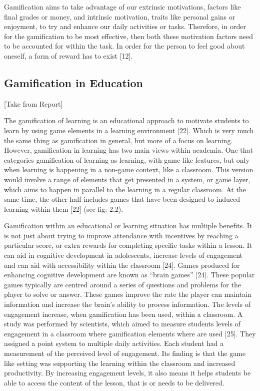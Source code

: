 \documentclass{sigchi}
\begin{document}
Gamification aims to take advantage of our extrinsic motivations, factors like final grades or money, and intrinsic motivation, traits like personal gains or enjoyment, to try and enhance our daily activities or tasks. Therefore, in order for the gamification to be most effective, then both these motivation factors need to be accounted for within the task. In order for the person to feel good about oneself, a form of reward has to exist [12]. 

\subsection{Gamification in Education}
[Take from Report]

The gamification of learning is an educational approach to motivate students to learn by using game elements in a learning environment [22]. Which is very much the same thing as gamification in general, but more of a focus on learning. However, gamification in learning has two main views within academia. One that categories gamification of learning as learning, with game-like features, but only when learning is happening in a non-game context, like a classroom. This version would involve a range of elements that get presented in a system, or game layer, which aims to happen in parallel to the learning in a regular classroom. At the same time, the other half includes games that have been designed to induced learning within them [22] (see fig: 2.2). 

Gamification within an educational or learning situation has multiple benefits. It is not just about trying to improve attendance with incentives by reaching a particular score, or extra rewards for completing specific tasks within a lesson. It can aid in cognitive development in adolescents, increase levels of engagement and can aid with accessibility within the classroom [24]. Games produced for enhancing cognitive development are known as “brain games” [24]. These popular games typically are centred around a series of questions and problems for the player to solve or answer. These games improve the rate the player can maintain information and increase the brain’s ability to process information. The levels of engagement increase, when gamification has been used, within a classroom. A study was performed by scientists, which aimed to measure students levels of engagement in a classroom where gamification elements where are used [25]. They assigned a point system to multiple daily activities. Each student had a measurement of the perceived level of engagement. Its finding is that the game like setting was supporting the learning within the classroom and increased productivity. By increasing engagement levels, it also means it helps students be able to access the content of the lesson, that is or needs to be delivered. 
\end{document}
